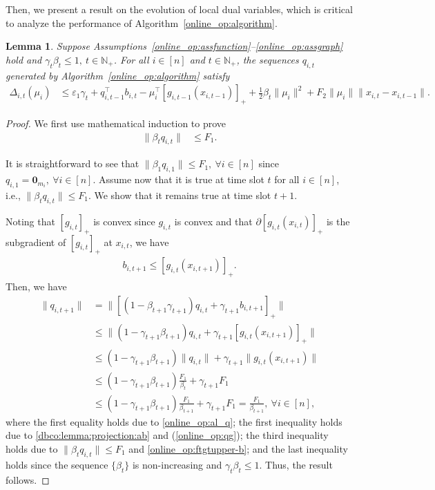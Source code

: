 \documentclass[12pt,draftcls,onecolumn]{IEEEtran}%
\newtheorem{lemma}{Lemma}
\begin{document}
Then, we present a result on the evolution of local dual variables, which is critical to analyze the performance of Algorithm~\ref{online_op:algorithm}.
\begin{lemma}\label{online_op:lemma_virtualbound}
Suppose Assumptions~\ref{online_op:assfunction}--\ref{online_op:assgraph} hold and $\gamma_{t}\beta_{t}\le1,~t\in\mathbb{N}_+$. For all $i\in[n]$ and $t\in\mathbb{N}_+$, the sequences $q_{i,t}$ generated by Algorithm~\ref{online_op:algorithm} satisfy
\begin{align}
\Delta_{i,t}(\mu_i)&\le \varepsilon_{1}\gamma_t
+q_{i,t-1}^\top b_{i,t}-\mu_i^\top[g_{i,t-1}(x_{i,t-1})]_+ 
+\frac{1}{2}\beta_t\|\mu_i\|^2+F_2\|\mu_i\|\|x_{i,t}-x_{i,t-1}\|.
\label{online_op:gvirtualnorm}
\end{align}
\end{lemma}
\begin{proof}

We first use mathematical induction to prove
\begin{align}
\|\beta_tq_{i,t}\|&\le F_1.\label{online_op:lemma_virtualboundeqy}
\end{align}

It is straightforward to see that $\|\beta_1q_{i,1}\|\le F_1,~\forall i\in[n]$ since $q_{i,1}={\bm 0}_{m_i},~\forall i\in[n]$. Assume now that it is true at time slot $t$ for all $i\in[n]$, i.e., $\|\beta_tq_{i,t}\|\le F_1$. We show that it remains true at time slot $t+1$.


Noting that $[g_{i,t}]_+$ is convex since $g_{i,t}$ is convex and that $\partial [g_{i,t}(x_{i,t})]_+$ is the subgradient of $[g_{i,t}]_+$ at $x_{i,t}$, we have
\begin{align}
b_{i,t+1}\le[g_{i,t}(x_{i,t+1})]_+.\label{online_op:qg}
\end{align}
Then, we have
\begin{align*}
\|q_{i,t+1}\|&=\|[(1-\beta_{t+1}\gamma_{t+1})q_{i,t}+\gamma_{t+1}b_{i,t+1}]_{+}\|\\
&\le\|(1-\gamma_{t+1}\beta_{t+1})q_{i,t}+\gamma_{t+1}[g_{i,t}(x_{i,t+1})]_+\|\\
&\le(1-\gamma_{t+1}\beta_{t+1})\|q_{i,t}\|
+\gamma_{t+1}\|g_{i,t}(x_{i,t+1})\|\\
&\le(1-\gamma_{t+1}\beta_{t+1})\frac{ F_1}{\beta_{t}}+\gamma_{t+1} F_1\\
&\le(1-\gamma_{t+1}\beta_{t+1})\frac{ F_1}{\beta_{t+1}}+\gamma_{t+1} F_1= \frac{ F_1}{\beta_{t+1}},~\forall i\in[n],
\end{align*}
where the first equality holds due to \eqref{online_op:al_q}; the first inequality holds due to \eqref{dbco:lemma:projection:ab} and (\ref{online_op:qg}); the third inequality holds due to $\|\beta_tq_{i,t}\|\le F_1$ and \eqref{online_op:ftgtupper-b}; and the last inequality holds since the sequence $\{\beta_t\}$ is non-increasing and $\gamma_{t}\beta_{t}\le1$.
Thus, the result follows.


\end{proof}
\end{document}
